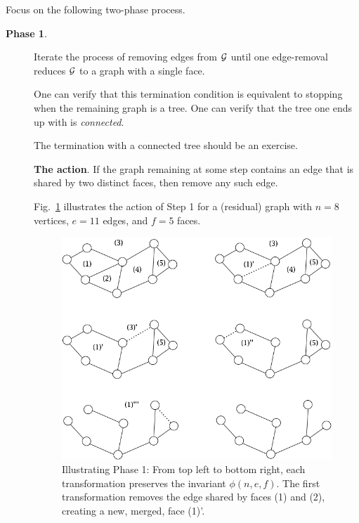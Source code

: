 \noindent
Focus on the following two-phase process.
\begin{description}
\item[{\bf Phase 1}.]
Iterate the process of removing edges from $\mbox{$\cal G$}$ until one edge-removal reduces $\mbox{$\cal G$}$ to
a graph with a single face.

One can verify that this termination condition is  equivalent to stopping when the remaining
graph is a tree.  One can verify that the tree one ends up with is {\em connected}.

{\Arny The termination with a connected tree should be an exercise.}

\bigskip

{\bf The action}.
If the graph remaining at some step contains an edge that is shared by
two distinct faces, then remove any such edge.

\smallskip

Fig.~\ref{fig:planarStep1} illustrates the action of Step 1 for a
(residual) graph with $n=8$ vertices, $e=11$ edges, and $f=5$ faces.
\begin{figure}[hbt]
\begin{center}
   \includegraphics[scale=0.35]{FiguresGraph/planarStep1}
\caption{Illustrating Phase 1: From top left to bottom right, each
  transformation preserves the invariant $\phi(n,e,f)$.  The first
  transformation removes the edge shared by faces (1) and (2),
  creating a new, merged, face (1)'.}
  \label{fig:planarStep1}
\end{center}
\end{figure}


\end{description}
